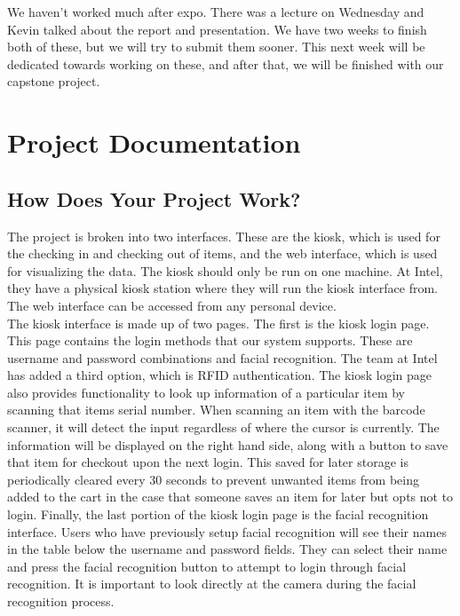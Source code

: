 \documentclass[10pt, onecolumn, twoside, peerreview]{IEEEtran}
\begin{document}
We haven't worked much after expo. There was a lecture on Wednesday and Kevin talked about the report and presentation. We have two weeks to finish both of these, but we will try to submit them sooner. This next week will be dedicated towards working on these, and after that, we will be finished with our capstone project.

\section{Project Documentation} 

\subsection{How Does Your Project Work?} 
The project is broken into two interfaces.
These are the kiosk, which is used for the checking in and checking out of items, and the web interface, which is used
for visualizing the data. The kiosk should only be run on one machine. At Intel, they have a physical kiosk station
where they will run the kiosk interface from. The web interface can be accessed from any personal device.\\

The kiosk interface is made up of two pages. The first is the kiosk login page. This page contains the login methods
that our system supports. These are username and password combinations and facial recognition. The team at Intel has
added a third option, which is RFID authentication. The kiosk login page also provides functionality to look up
information of a particular item by scanning that items serial number. When scanning an item with the barcode scanner,
it will detect the input regardless of where the cursor is currently. The information will be displayed on the right
hand side, along with a button to save that item for checkout upon the next login. This saved for later storage is
periodically cleared every 30 seconds to prevent unwanted items from being added to the cart in the case that someone
saves an item for later but opts not to login. Finally, the last portion of the kiosk login page is the facial
recognition interface. Users who have previously setup facial recognition will see their names in the table below the
username and password fields. They can select their name and press the facial recognition button to attempt to login
through facial recognition. It is important to look directly at the camera during the facial recognition process.\\
\end{document}
